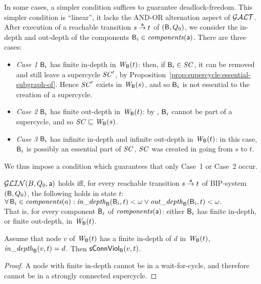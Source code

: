 In some cases, a simpler condition suffices to guarantee deadlock-freedom. This simpler condition is ``linear'', \ie it lacks the AND-OR alternation
aspect of $\GAO$. After execution of a reachable transition $s \la{\act} t$ of $(\B, Q_0)$, 
we consider the in-depth and out-depth of the components $\B_i \in \cmps{\act}$. There are three cases:
%
\begin{itemize}

\item \emph{Case 1} \label{case:finite-in} $\B_i$ has finite in-depth in $\wfg{\B}{t}$: then, if $\B_i \in \SC$, it can be removed and still leave a
  supercycle $\SC'$, by Proposition~\ref{prop:supercycle:essential-subgraph-of}. Hence $\SC'$ exists in $\wfg{\B}{s}$, and so $\B_i$ is not essential
  to the creation of a supercycle.

\item \emph{Case 2} \label{case:finite-out} $\B_i$ has finite out-depth in $\wfg{\B}{t}$: by , $\B_i$ cannot be
  part of a supercycle, and so $\SC \subg \wfg{\B}{s}$.

\item \emph{Case 3} \label{case:infinite-both} $\B_i$ has infinite in-depth and infinite out-depth in $\wfg{\B}{t}$: in this case, $\B_i$ is possibly
  an essential part of $\SC$, \ie $\SC$ was created in going from $s$ to $t$.

\end{itemize}
We thus impose a condition which guarantees that only 
Case~1 %
or Case~2 %
occur. 



\begin{definition} \label{def:global:dfc}
$\GLin(B,Q_0,\act)$ holds iff, for every reachable transition $s \goesto[\act] t$ of BIP-system $(\B, Q_0)$, 
the following holds in state $t$:\\
\ind  $\fa \B_i \in \cmps{a}: \widepth{\B}{\B_i}{t} < \omega \lor \wodepth{\B}{\B_i}{t} < \omega.$\\
That is, for every component $\B_i$ of $\cmps{\act}$:  either $\B_i$ has finite in-depth, or finite out-depth, in $\wfg{\B}{t}$.
\end{definition}



\begin{proposition} \label{prop:indepth-finite-implies-scViol}
Assume that node $v$ of $\wfg{\B}{t}$ has a finite in-depth of $d$ in $\wfg{\B}{t}$, \ie 
$\widepth{\B}{v}{t} = d$. Then $\connViol{v}{t}$.
\end{proposition}
%
\begin{proof}
A node with finite in-depth cannot be in a wait-for-cycle, and
therefore cannot be in a strongly connected supercycle.
\end{proof}


